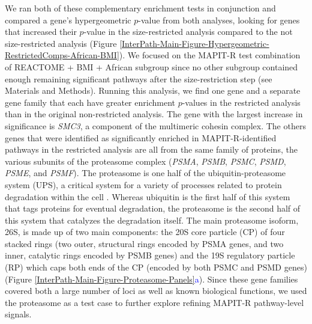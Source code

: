 \documentclass[12pt,a4paper]{article}
\begin{document}
We ran both of these complementary enrichment tests in conjunction and compared a gene's hypergeometric $p$-value from both analyses, looking for genes that increased their $p$-value in the size-restricted analysis compared to the not size-restricted analysis (Figure \ref{InterPath-Main-Figure-Hypergeometric-RestrictedComps-African-BMI}). We focused on the MAPIT-R test combination of REACTOME + BMI + African subgroup since no other subgroup contained enough remaining significant pathways after the size-restriction step (see Materials and Methods). Running this analysis, we find one gene and a separate gene family that each have greater enrichment $p$-values in the restricted analysis than in the original non-restricted analysis. The gene with the largest increase in significance is {\emph{SMC3}}, a component of the multimeric cohesin complex. The others genes that were identified as significantly enriched in MAPIT-R-identified pathways in the restricted analysis are all from the same family of proteins, the various subunits of the proteasome complex ({\emph{PSMA}}, {\emph{PSMB}}, {\emph{PSMC}}, {\emph{PSMD}}, {\emph{PSME}}, and {\emph{PSMF}}). The proteasome is one half of the ubiquitin-proteasome system (UPS), a critical system for a variety of processes related to protein degradation within the cell \citep{Voges1999,Livneh2016,Collins2017}. Whereas ubiquitin is the first half of this system that tags proteins for eventual degradation, the proteasome is the second half of this system that catalyzes the degradation itself. The main proteasome isoform, 26S, is made up of two main components: the 20S core particle (CP) of four stacked rings (two outer, structural rings encoded by PSMA genes, and two inner, catalytic rings encoded by PSMB genes) and the 19S regulatory particle (RP) which caps both ends of the CP (encoded by both PSMC and PSMD genes) (Figure \ref{InterPath-Main-Figure-Proteasome-Panels}\textcolor{blue}{a}). Since these gene families covered both a large number of loci as well as known biological functions, we used the proteasome as a test case to further explore refining MAPIT-R pathway-level signals.
\end{document}
